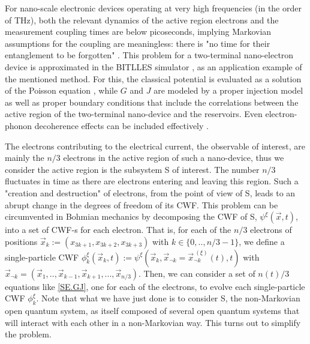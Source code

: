 \documentclass[11pt, a4paper]{article} %
\begin{document}
For nano-scale electronic devices operating at very high frequencies (in the order of THz), both the relevant dynamics of the active region electrons and the measurement coupling times are below picoseconds, implying Markovian assumptions for the coupling are meaningless: there is "no time for their entanglement to be forgotten" \cite{Thz}. This problem for a two-terminal nano-electron device is approximated in the BITLLES simulator \cite{tdp,Pois,Thz}, as an application example of the mentioned method. For this, the classical potential is evaluated as a solution of the Poisson equation \cite{Pois}, while $G$ and $J$ are modeled by a proper injection model \cite{inject} as well as proper boundary conditions \cite{boundary1, boundary2} that include the correlations between the active region of the two-terminal nano-device and the reservoirs. Even electron-phonon decoherence effects can be included effectively \cite{eph}.

The electrons contributing to the electrical current, the observable of interest, are mainly the $n/3$ electrons in the active region of such a nano-device, thus we consider the active region is the subsystem S of interest. The number $n/3$ fluctuates in time as there are electrons entering and leaving this region. Such a "creation and destruction" of electrons, from the point of view of S, leads to an abrupt change in the degrees of freedom of its CWF. This problem can be circumvented in Bohmian mechanics by decomposing the CWF of S, $\psi^{\xi}(\vec{x},t)$, into a set of CWF-s for each electron. That is, for each of the $n/3$ electrons of positions $\vec{x}_k:=(x_{3k+1}, x_{3k+2}, x_{3k+3})$ with $k\in\{0,..,n/3-1\}$, we define a single-particle CWF $\phi_k^\xi(\vec{x}_k, t):=\psi^{\xi}(\vec{x}_k, \vec{x}_{\neg k}=\vec{x}_{\neg k}^{\:(\xi)}(t),t)$ with $\vec{x}_{\neg k}=(\vec{x}_1,..,\vec{x}_{k-1}, \vec{x}_{k+1}, ...,\vec{x}_{n/3})$. Then, we can consider a set of $n(t)/3$ equations like \eqref{SE.GJ}, one for each of the electrons, to evolve each single-particle CWF $\phi_k^\xi$. Note that what we have just done is to consider S, the non-Markovian open quantum system, as itself composed of several open quantum systems that will interact with each other in a non-Markovian way. This turns out to simplify the problem.
\end{document}
